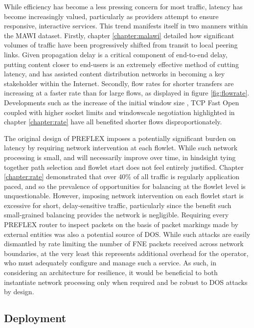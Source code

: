 While efficiency has become a less pressing concern for most traffic, latency has become increasingly valued, particularly as providers attempt to ensure responsive, interactive services.
This trend manifests itself in two manners within the \ac{MAWI} dataset.
Firstly, chapter \ref{chapter:malawi} detailed how significant volumes of traffic have been progressively shifted from transit to local peering links.
Given propagation delay is a critical component of end-to-end delay, putting content closer to end-users is an extremely effective method of cutting latency, and has assisted content distribution networks in becoming a key stakeholder within the Internet.
Secondly, flow rates for shorter transfers are increasing at a faster rate than for large flows, as displayed in figure \ref{fig:flowrate}.
Developments such as the increase of the initial window size \cite{Dukkipati:2010p160}, \ac{TCP} Fast Open \cite{Radhakrishnan:2011:TFO:2079296.2079317} coupled with higher socket limits and windowscale negotiation highlighted in chapter \ref{chapter:rate} have all benefited shorter flows disproportionately.

The original design of \ac{PREFLEX} imposes a potentially significant burden on latency by requiring network intervention at each flowlet.
While such network processing is small, and will necessarily improve over time, in hindsight tying together path selection and flowlet start does not feel entirely justified.
Chapter \ref{chapter:rate} demonstrated that over 40\% of all traffic is regularly application paced, and so the prevalence of opportunities for balancing at the flowlet level is unquestionable.
However, imposing network intervention on each flowlet start is excessive for short, delay-sensitive traffic, particularly since the benefit such small-grained balancing provides the network is negligible.
Requiring every \ac{PREFLEX} router to inspect packets on the basis of packet markings made by external entities was also a potential source of \acf{DOS}.
While such attacks are easily dismantled by rate limiting the number of \ac{FNE} packets received across network boundaries, at the very least this represents additional overhead for the operator, who must adequately configure and manage such a service.
As such, in considering an architecture for resilience, it would be beneficial to both instantiate network processing only when required and be robust to \ac{DOS} attacks by design.

\subsection{Deployment}

